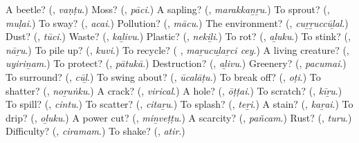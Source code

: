 \begin{tcolorbox}[breakable,colback=teal!4,colframe=teal!35!black,title={Before you move on}]
A beetle? (\textbf{}, \emph{vaṇṭu}.) Moss? (\textbf{}, \emph{pāci}.) A sapling? (\textbf{}, \emph{marakkaṉṟu}.) To sprout? (\textbf{}, \emph{muḷai}.) To sway? (\textbf{}, \emph{acai}.) Pollution? (\textbf{}, \emph{mācu}.) The environment? (\textbf{}, \emph{cuṟṟuccūḻal}.) Dust? (\textbf{}, \emph{tūci}.) Waste? (\textbf{}, \emph{kaḻivu}.) Plastic? (\textbf{}, \emph{nekiḻi}.) To rot? (\textbf{}, \emph{aḻuku}.) To stink? (\textbf{}, \emph{nāṟu}.) To pile up? (\textbf{}, \emph{kuvi}.) To recycle? (\textbf{ }, \emph{maṟucuḻaṟci cey}.) A living creature? (\textbf{}, \emph{uyiriṉam}.) To protect? (\textbf{}, \emph{pātukā}.) Destruction? (\textbf{}, \emph{aḻivu}.) Greenery? (\textbf{}, \emph{pacumai}.) To surround? (\textbf{}, \emph{cūḻ}.) To swing about? (\textbf{}, \emph{ūcalāṭu}.) To break off? (\textbf{}, \emph{oṭi}.) To shatter? (\textbf{}, \emph{noṟuṅku}.) A crack? (\textbf{}, \emph{virical}.) A hole? (\textbf{}, \emph{ōṭṭai}.) To scratch? (\textbf{}, \emph{kīṟu}.) To spill? (\textbf{}, \emph{cintu}.) To scatter? (\textbf{}, \emph{citaṟu}.) To splash? (\textbf{}, \emph{teṟi}.) A stain? (\textbf{}, \emph{kaṟai}.) To drip? (\textbf{}, \emph{oḻuku}.) A power cut? (\textbf{}, \emph{miṉveṭṭu}.) A scarcity? (\textbf{}, \emph{pañcam}.) Rust? (\textbf{}, \emph{turu}.) Difficulty? (\textbf{}, \emph{ciramam}.) To shake? (\textbf{}, \emph{atir}.)
\end{tcolorbox}
